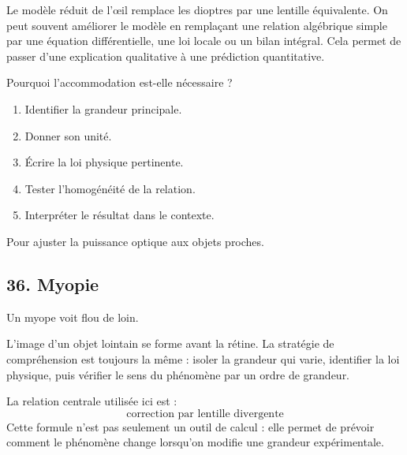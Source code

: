 \documentclass[11pt,a4paper]{article}
\begin{document}
\begin{approfondissementbox}
Le modèle réduit de l'œil remplace les dioptres par une lentille équivalente.
On peut souvent améliorer le modèle en remplaçant une relation algébrique simple par une équation différentielle, une loi locale ou un bilan intégral. Cela permet de passer d'une explication qualitative à une prédiction quantitative.
\end{approfondissementbox}

\begin{exercicebox}
Pourquoi l'accommodation est-elle nécessaire ?
\begin{enumerate}
  \item Identifier la grandeur principale.
  \item Donner son unité.
  \item Écrire la loi physique pertinente.
  \item Tester l'homogénéité de la relation.
  \item Interpréter le résultat dans le contexte.
\end{enumerate}
\end{exercicebox}

\begin{corrigebox}[Indication]
Pour ajuster la puissance optique aux objets proches.
\end{corrigebox}


\subsection{36. Myopie}

\begin{exemplebox}
Un myope voit flou de loin.
\end{exemplebox}

\begin{methodebox}
L'image d'un objet lointain se forme avant la rétine.
La stratégie de compréhension est toujours la même : isoler la grandeur qui varie, identifier la loi physique, puis vérifier le sens du phénomène par un ordre de grandeur.
\end{methodebox}

\begin{theorembox}
La relation centrale utilisée ici est :
\[
\text{correction par lentille divergente}
\]
Cette formule n'est pas seulement un outil de calcul : elle permet de prévoir comment le phénomène change lorsqu'on modifie une grandeur expérimentale.
\end{theorembox}
\end{document}
